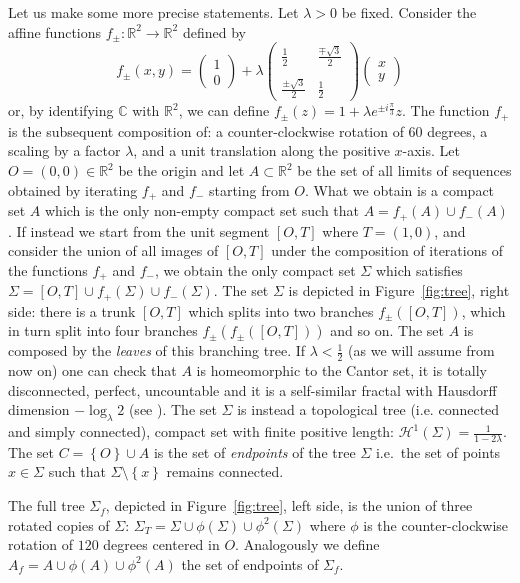 \documentclass{amsart}
\newcommand{\RR}{\mathbb R}
\newcommand{\CC}{\mathbb C}
\renewcommand{\H}{\mathcal H}
\newcommand{\ENCLOSE}[1]{\left\{#1\right\}}
\renewcommand{\H}{\mathcal{H}}
\theoremstyle{definition}
\theoremstyle{remark}
\begin{document}
Let us make some more precise statements.
Let $\lambda>0$ be fixed.
Consider the affine functions $f_\pm\colon \RR^2\to \RR^2$ defined by
\[
  f_\pm(x,y) = \begin{pmatrix} 1 \\ 0 \end{pmatrix} 
    + \lambda \begin{pmatrix} 
        \frac 1 2 & \frac{\mp\sqrt 3}{2} \\\\ 
        \frac{\pm\sqrt 3}{2} & \frac 1 2 
      \end{pmatrix} \begin{pmatrix} x \\ y \end{pmatrix}
\]
or, by identifying $\CC$ with $\RR^2$,
we can define $f_\pm(z) = 1 + \lambda e^{\pm i \frac \pi 3} z$.
The function $f_+$ is the subsequent composition of: a counter-clockwise rotation of $60$ degrees,
a scaling by a factor $\lambda$, and a unit translation along the positive $x$-axis.
Let $O=(0,0)\in \RR^2$ be the origin and let $A\subset \RR^2$ be the set of all limits of sequences obtained 
by iterating $f_+$ and $f_-$ starting from $O$.
What we obtain is a compact set $A$ which is the only non-empty compact set 
such that $A=f_+(A)\cup f_-(A)$.
If instead we start from the unit segment $[O,T]$ where $T=(1,0)$, and 
consider the union of all images of $[O,T]$ under the composition of iterations of the 
functions $f_+$ and $f_-$, we obtain the only compact set $\Sigma$ which satisfies 
$\Sigma=[O,T]\cup f_+(\Sigma)\cup f_-(\Sigma)$.
The set $\Sigma$ is depicted in Figure~\ref{fig:tree}, right side:
there is a trunk $[O,T]$ which splits into two branches $f_\pm([O,T])$, 
which in turn split into four branches $f_\pm(f_\pm([O,T]))$ and so on.
The set $A$ is composed by the \emph{leaves} of this branching tree.
If $\lambda < \frac 1 2$ (as we will assume from now on)
one can check that $A$ is 
homeomorphic to the Cantor set, it is totally disconnected, 
perfect, uncountable and it is a self-similar fractal with Hausdorff dimension
$-\log_\lambda 2$ (see \cite{Hut81}).
The set $\Sigma$ is instead a topological tree (i.e.{} connected and simply connected), 
compact set with finite positive length: $\H^1(\Sigma) = \frac{1}{1-2\lambda}$.
The set $C=\ENCLOSE{O}\cup A$ is the set of \emph{endpoints} of the tree $\Sigma$ i.e.\ 
the set of points $x\in \Sigma$ such that $\Sigma\setminus\ENCLOSE{x}$ remains connected.

The full tree $\Sigma_f$, depicted in Figure~\ref{fig:tree}, left side,
is the union of three rotated copies of $\Sigma$: $\Sigma_T = \Sigma \cup \phi(\Sigma) \cup \phi^2(\Sigma)$
where $\phi$ is the counter-clockwise rotation of $120$ degrees centered in $O$.
Analogously we define $A_f = A \cup \phi(A) \cup \phi^2(A)$ the set of endpoints of $\Sigma_f$.
\end{document}
